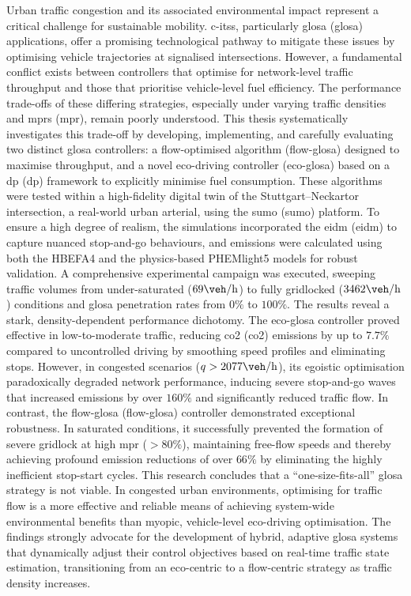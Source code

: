 Urban traffic congestion and its associated environmental impact represent a critical challenge for sustainable mobility. \aclp{c-its}, particularly \acl{glosa} (\acs{glosa}) applications, offer a promising technological pathway to mitigate these issues by optimising vehicle trajectories at signalised intersections. However, a fundamental conflict exists between controllers that optimise for network-level traffic throughput and those that prioritise vehicle-level fuel efficiency. The performance trade-offs of these differing strategies, especially under varying traffic densities and \aclp{mpr} (\acs{mpr}), remain poorly understood.
\mynewline
This thesis systematically investigates this trade-off by developing, implementing, and carefully evaluating two distinct \ac{glosa} controllers: a flow-optimised algorithm (\acs{flow-glosa}) designed to maximise throughput, and a novel eco-driving controller (\acs{eco-glosa}) based on a \acl{dp} (\acs{dp}) framework to explicitly minimise fuel consumption. These algorithms were tested within a high-fidelity digital twin of the Stuttgart–Neckartor intersection, a real-world urban arterial, using the \acl{sumo} (\acs{sumo}) platform. To ensure a high degree of realism, the simulations incorporated the \acl{eidm} (\acs{eidm}) to capture nuanced stop-and-go behaviours, and emissions were calculated using both the HBEFA4 and the physics-based PHEMlight5 models for robust validation. A comprehensive experimental campaign was executed, sweeping traffic volumes from under-saturated ($69\unit{\veh\per\hour}$) to fully gridlocked ($3462\unit{\veh\per\hour}$) conditions and \ac{glosa} penetration rates from $0\%$ to $100\%$.
\mynewline
The results reveal a stark, density-dependent performance dichotomy. The \ac{eco-glosa} controller proved effective in low-to-moderate traffic, reducing \acl{co2} (\acs{co2}) emissions by up to $7.7\%$ compared to uncontrolled driving by smoothing speed profiles and eliminating stops. However, in congested scenarios ($q > 2077\unit{\veh\per\hour}$), its egoistic optimisation paradoxically degraded network performance, inducing severe stop-and-go waves that increased emissions by over $160\%$ and significantly reduced traffic flow. In contrast, the \acl{flow-glosa} (\acs{flow-glosa}) controller demonstrated exceptional robustness. In saturated conditions, it successfully prevented the formation of severe gridlock at high \ac{mpr} ($>80\%$), maintaining free-flow speeds and thereby achieving profound emission reductions of over $66\%$ by eliminating the highly inefficient stop-start cycles.
\mynewline
This research concludes that a \enquote{one-size-fits-all} \ac{glosa} strategy is not viable. In congested urban environments, optimising for traffic flow is a more effective and reliable means of achieving system-wide environmental benefits than myopic, vehicle-level eco-driving optimisation. The findings strongly advocate for the development of hybrid, adaptive \ac{glosa} systems that dynamically adjust their control objectives based on real-time traffic state estimation, transitioning from an eco-centric to a flow-centric strategy as traffic density increases.